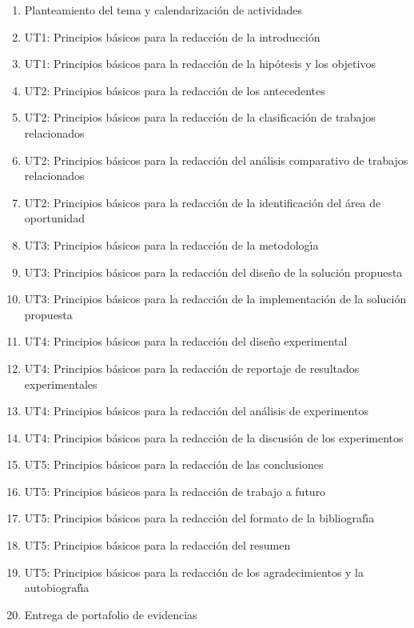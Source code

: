 \documentclass[10 pt]{article}
\begin{document}
\newpage







\begin{enumerate}[itemsep=-2pt]
\item Planteamiento del tema y calendarizaci\'{o}n de actividades
\item UT1: Principios b\'{a}sicos para la redacci\'{o}n de la introducci\'{o}n
\item UT1: Principios b\'{a}sicos para la redacci\'{o}n de la hip\'{o}tesis y los objetivos
\item UT2: Principios b\'{a}sicos para la redacci\'{o}n de los antecedentes
\item UT2: Principios b\'{a}sicos para la redacci\'{o}n de la clasificaci\'{o}n de trabajos relacionados
\item UT2: Principios b\'{a}sicos para la redacci\'{o}n del an\'{a}lisis comparativo de trabajos relacionados
\item UT2: Principios b\'{a}sicos para la redacci\'{o}n de la identificaci\'{o}n del \'{a}rea de oportunidad
\item UT3: Principios b\'{a}sicos para la redacci\'{o}n de la metodolog\'{\i}a
\item UT3: Principios b\'{a}sicos para la redacci\'{o}n del dise\~{n}o de la soluci\'{o}n propuesta
\item UT3: Principios b\'{a}sicos para la redacci\'{o}n de la implementaci\'{o}n de la soluci\'{o}n propuesta
\item UT4: Principios b\'{a}sicos para la redacci\'{o}n del dise\~{n}o experimental
\item UT4: Principios b\'{a}sicos para la redacci\'{o}n de reportaje de resultados experimentales
\item UT4: Principios b\'{a}sicos para la redacci\'{o}n del an\'{a}lisis de experimentos
\item UT4: Principios b\'{a}sicos para la redacci\'{o}n de la discusi\'{o}n de los experimentos
\item UT5: Principios b\'{a}sicos para la redacci\'{o}n de las conclusiones
\item UT5: Principios b\'{a}sicos para la redacci\'{o}n de trabajo a futuro
\item UT5: Principios b\'{a}sicos para la redacci\'{o}n del formato de la bibliograf\'{\i}a
\item UT5: Principios b\'{a}sicos para la redacci\'{o}n del resumen
\item UT5: Principios b\'{a}sicos para la redacci\'{o}n de los agradecimientos y la autobiograf\'{\i}a
\item Entrega de portafolio de evidencias
\end{enumerate}
\end{document}
